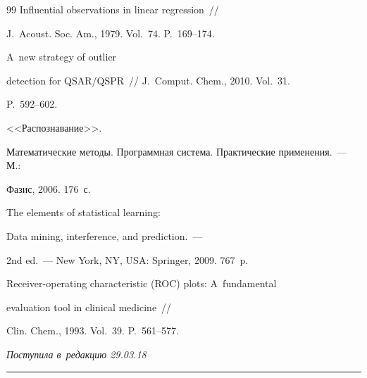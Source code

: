 {{\begin{thebibliography}{99}
 Influential observations in linear regression~/\!\!/ 

J.~Acoust. Soc. Am., 1979. Vol.~74. P.~169--174.


 A~new strategy of outlier 

detection for QSAR/QSPR~/\!\!/ J.~Comput. Chem., 2010. Vol.~31. 

P.~592--602.


 <<Распознавание>>. 

Математические методы. Программная система. Практические применения.~--- М.: 

Фазис, 2006. 176~с. 


 The elements of statistical learning:

Data mining, interference, and prediction.~---

 2nd  ed.~--- New York, NY, USA: Springer, 2009. 767~p.


 Receiver-operating characteristic (ROC) plots: A~fundamental 

evaluation tool in clinical medicine~/\!\!/ 

Clin. Chem., 1993. Vol.~39. P.~561--577. 

        \end{thebibliography}

} }





\vspace*{-3pt}



\hfill{\small\textit{Поступила в~редакцию 29.03.18}}









\vspace*{8pt}



\hrule



\vspace*{2pt}




